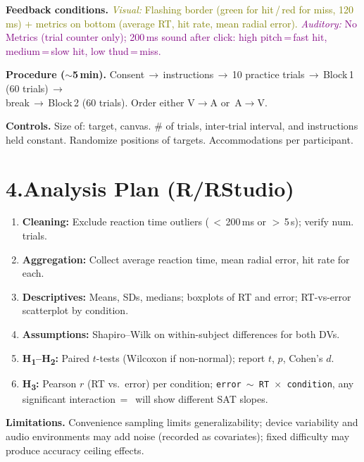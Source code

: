 \documentclass[12pt,letterpaper]{article}
\begin{document}
\noindent\textbf{Feedback conditions.}
\textcolor{olive}{\emph{Visual:} Flashing border (green for hit\,/\,red for miss, 120\,ms) + metrics on bottom (average RT, hit rate, mean radial error).} \textcolor{purple}{\emph{Auditory:} No Metrics (trial counter only); 200\,ms sound after click: high pitch\,=\,fast hit, medium\,=\,slow hit, low thud\,=\,miss.}

\noindent\textbf{Procedure ($\sim$5\,min).}
Consent\,$\to$\,instructions\,$\to$\,10 practice trials\,$\to$\,Block\,1 (60 trials)\,$\to$\, \\break\,$\to$\,Block\,2 (60 trials). Order either V$\to$A or\ A$\to$V.

\noindent\textbf{Controls.} Size of: target, canvas. $\#$ of trials, inter-trial interval, and instructions held constant. Randomize positions of targets. Accommodations per participant.

\section*{4.\enspace Analysis Plan (R/RStudio)}
\begin{enumerate}
  \item \textbf{Cleaning:} Exclude reaction time outliers (\,$<$\,200\,ms or $>$\,5\,s); verify num. trials.
  \item \textbf{Aggregation:} Collect average reaction time, mean radial error, hit rate for each.
  \item \textbf{Descriptives:} Means, SDs, medians; boxplots of RT and error; RT-vs-error scatterplot by condition.
  \item \textbf{Assumptions:} Shapiro--Wilk on within-subject differences for both DVs.
  \item \textbf{H\textsubscript{1}--H\textsubscript{2}:} Paired $t$-tests (Wilcoxon if non-normal); report $t$, $p$, Cohen's $d$.
  \item \textbf{H\textsubscript{3}:} Pearson $r$ (RT vs.\ error) per condition; \texttt{error\,$\sim$\,RT\,$\times$\,condition}, any significant interaction\,$=$\, will show different SAT slopes.
\end{enumerate}

\noindent\textbf{Limitations.} Convenience sampling limits generalizability; device variability and audio environments may add noise (recorded as covariates); fixed difficulty may produce accuracy ceiling effects.
\end{document}
